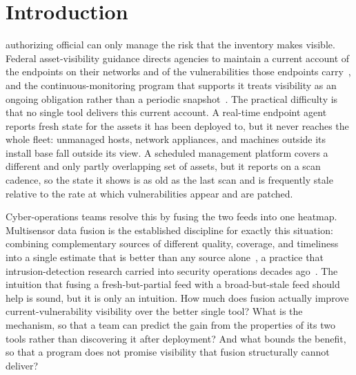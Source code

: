 \documentclass[journal]{IEEEtran}
\begin{document}
\section{Introduction}
 authorizing official can only manage the risk that the inventory makes visible.
Federal asset-visibility guidance directs agencies to maintain a current account of the endpoints
on their networks and of the vulnerabilities those endpoints carry~\cite{cisabod2301,nist80137},
and the continuous-monitoring program that supports it treats visibility as an ongoing obligation
rather than a periodic snapshot~\cite{nist80137a}. The practical difficulty is that no single tool
delivers this current account. A real-time endpoint agent reports fresh state for the assets it has
been deployed to, but it never reaches the whole fleet: unmanaged hosts, network appliances, and
machines outside its install base fall outside its view. A scheduled management platform covers a
different and only partly overlapping set of assets, but it reports on a scan cadence, so the state
it shows is as old as the last scan and is frequently stale relative to the rate at which
vulnerabilities appear and are patched.

Cyber-operations teams resolve this by fusing the two feeds into one heatmap. Multisensor data
fusion is the established discipline for exactly this situation: combining complementary sources of
different quality, coverage, and timeliness into a single estimate that is better than any source
alone~\cite{hall1997fusion}, a practice that intrusion-detection research carried into security
operations decades ago~\cite{bass2000fusion}. The intuition that fusing a fresh-but-partial feed
with a broad-but-stale feed should help is sound, but it is only an intuition. How much does fusion
actually improve current-vulnerability visibility over the better single tool? What is the
mechanism, so that a team can predict the gain from the properties of its two tools rather than
discovering it after deployment? And what bounds the benefit, so that a program does not promise
visibility that fusion structurally cannot deliver?
\end{document}
